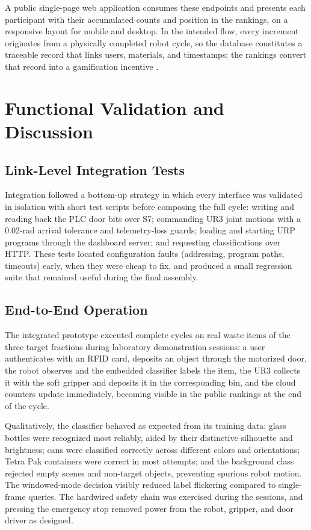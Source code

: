\documentclass[conference]{IEEEtran}
\begin{document}
A public single-page web application consumes these endpoints and presents each participant with their accumulated counts and position in the rankings, on a responsive layout for mobile and desktop. In the intended flow, every increment originates from a physically completed robot cycle, so the database constitutes a traceable record that links users, materials, and timestamps; the rankings convert that record into a gamification incentive \cite{b12}.

\section{Functional Validation and Discussion}
\subsection{Link-Level Integration Tests}
Integration followed a bottom-up strategy in which every interface was validated in isolation with short test scripts before composing the full cycle: writing and reading back the PLC door bits over S7; commanding UR3 joint motions with a 0.02-rad arrival tolerance and telemetry-loss guards; loading and starting URP programs through the dashboard server; and requesting classifications over HTTP. These tests located configuration faults (addressing, program paths, timeouts) early, when they were cheap to fix, and produced a small regression suite that remained useful during the final assembly.

\subsection{End-to-End Operation}
The integrated prototype executed complete cycles on real waste items of the three target fractions during laboratory demonstration sessions: a user authenticates with an RFID card, deposits an object through the motorized door, the robot observes and the embedded classifier labels the item, the UR3 collects it with the soft gripper and deposits it in the corresponding bin, and the cloud counters update immediately, becoming visible in the public rankings at the end of the cycle.

Qualitatively, the classifier behaved as expected from its training data: glass bottles were recognized most reliably, aided by their distinctive silhouette and brightness; cans were classified correctly across different colors and orientations; Tetra Pak containers were correct in most attempts; and the background class rejected empty scenes and non-target objects, preventing spurious robot motion. The windowed-mode decision visibly reduced label flickering compared to single-frame queries. The hardwired safety chain was exercised during the sessions, and pressing the emergency stop removed power from the robot, gripper, and door driver as designed.
\end{document}
